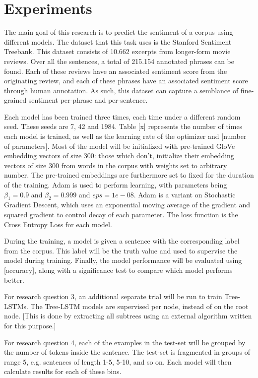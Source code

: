 \section{Experiments}
\label{sec: experiments}
The main goal of this research is to predict the sentiment of a corpus using
different models. The dataset that this task uses is the Stanford Sentiment
Treebank\cite{socher2013recursive}. This dataset consists of 10.662 excerpts
from longer-form movie reviews. Over all the sentences, a total of 215.154
annotated phrases can be found. Each of these reviews have an associated
sentiment score from the originating review, and each of these phrases have an
associated sentiment score through human annotation. As such, this dataset can
capture a semblance of fine-grained sentiment per-phrase and per-sentence.

Each model has been trained three times, each time under a different random
seed. These seeds are 7, 42 and 1984. Table [x] represents the number of times
each model is trained, as well as the learning rate of the optimizer and [number
of parameters]. Most of the model will be initialized with pre-trained
GloVe\cite{pennington2014glove} embedding vectors of size 300: those which
don't, initialize their embedding vectors of size 300 from words in the corpus
with weights set to arbitrary number. The pre-trained embeddings are furthermore
set to fixed for the duration of the training.
Adam\cite{DBLP:journals/corr/KingmaB14} is used to perform learning, with
parameters being $\beta_{1}=0.9$ and $\beta_{2}=0.999$ and $eps=1e-08$. Adam is
a variant on Stochastic Gradient Descent, which uses an exponential moving
average of the gradient and squared gradient to control decay of each parameter.
The loss function is the Cross Entropy Loss for each model.

During the training, a model is given a sentence with the corresponding label
from the corpus. This label will be the truth value and used to supervise the
model during training. Finally, the model performance will be evaluated using
[accuracy], along with a significance test to compare which model performs
better.

For research question 3, an additional separate trial will be run to train
Tree-LSTMs. The Tree-LSTM models are supervised per node, instead of on the root
node. [This is done by extracting all subtrees using an external algorithm
written for this purpose.]

For research question 4, each of the examples in the test-set will be grouped by
the number of tokens inside the sentence. The test-set is fragmented in groups
of range 5, e.g. sentences of length 1-5, 5-10, and so on. Each model will then
calculate results for each of these bins.

